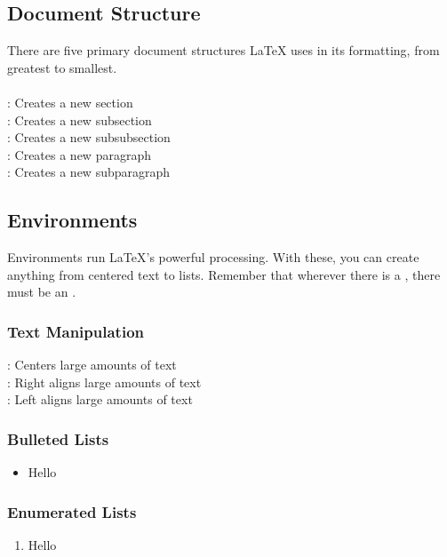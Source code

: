 \subsection{Document Structure}
There are five primary document structures LaTeX uses in its formatting, from greatest to smallest.\\\\
: Creates a new section\\
: Creates a new subsection\\
: Creates a new subsubsection\\
: Creates a new paragraph\\
: Creates a new subparagraph

\subsection{Environments}
Environments run \LaTeX{}'s powerful processing.  With these, you can create anything from centered text to lists.  Remember that wherever there is a , there must be an .
\subsubsection{Text Manipulation}
: Centers large amounts of text\\
: Right aligns large amounts of text\\
: Left aligns large amounts of text
\subsubsection{Bulleted Lists}
\begin{itemize}
\item Hello
\end{itemize}
\subsubsection{Enumerated Lists}
\begin{enumerate}
\item Hello
\end{enumerate}






